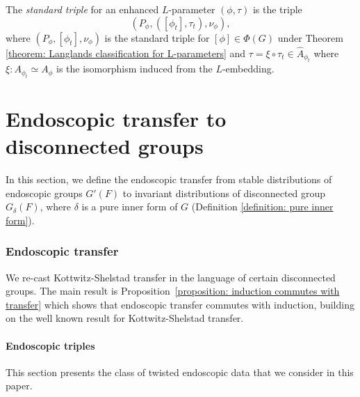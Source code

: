 \documentclass[11pt,letterpaper]{amsart}
\numberwithin{equation}{section}
\begin{document}
\begin{definition}\label{definition: standard triple for enhanced parameters}
    The {\it standard triple} for an enhanced $L$-parameter $(\phi,\tau)$ is the triple 
    \[
    (P_\phi,([\phi_t],\tau_t),\nu_\phi), 
    \]
    where $(P_\phi,[\phi_t],\nu_\phi)$ is the standard triple for $[\phi]\in \Phi(G)$ under Theorem \ref{theorem: Langlands classification for L-parameters} and $\tau= \xi \circ \tau_t \in \widehat{A}_{\phi_t}$ where $\xi: A_{\phi_t} \simeq A_{\phi}$ is the isomorphism induced from the $L$-embedding. 
\end{definition}

\part{Endoscopic transfer to disconnected groups}\label{part: II Transfer}

In this section, we define the endoscopic transfer from stable distributions of endoscopic groups $G'(F)$ to invariant distributions of disconnected group $G_\delta(F)$, where $\delta$ is a pure inner form of $G$ (Definition \ref{definition: pure inner form}).

\section{Endoscopic transfer}\label{section: endoscopic transfer}

We re-cast Kottwitz-Shelstad transfer in the language of certain disconnected groups. 
The main result is Proposition~\ref{proposition: induction commutes with transfer} which shows that endoscopic transfer commutes with induction, building on the well known result for Kottwitz-Shelstad transfer.



\subsection{Endoscopic triples}\label{subsection: endoscopic triple}
This section presents the class of twisted endoscopic data that we consider in this paper. 
\end{document}
